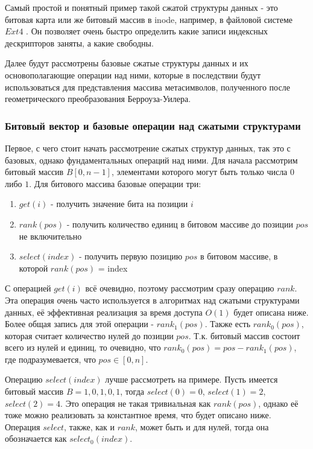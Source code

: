 \documentclass[a4paper,12pt]{article}
\begin{document}
Самый простой и понятный пример такой сжатой структуры данных - это битовая карта или же битовый массив в inode, например, в файловой системе $Ext4$ \cite{mathur2007new}. Он позволяет очень быстро определить какие записи индексных дескрипторов заняты, а какие свободны.

Далее будут рассмотрены базовые сжатые структуры данных и их основополагающие операции над ними, которые в последствии будут использоваться для представления массива метасимволов, полученного после геометрического преобразования Берроуза-Уилера.

\subsubsection{Битовый вектор и базовые операции над сжатыми структурами}
Первое, с чего стоит начать рассмотрение сжатых структур данных, так это с базовых, однако фундаментальных операций над ними. Для начала рассмотрим битовый массив $B[0, n-1]$, элементами которого могут быть только числа $0$ либо $1$. Для битового массива базовые операции три:
\begin{enumerate}
    \item $get(i)$  - получить значение бита на позиции $i$
    \item $rank(pos)$ - получить количество единиц в битовом массиве до позиции $pos$ не включительно
    \item $select(index)$ - получить первую позицию $pos$ в битовом массиве, в которой $rank(pos)$ = index
\end{enumerate}

С операцией $get(i)$ всё очевидно, поэтому рассмотрим сразу операцию $rank$. Эта операция очень часто используется в алгоритмах над сжатыми структурами данных, её эффективная реализация за время доступа $O(1)$ будет описана ниже. Более общая запись для этой операции - $rank_1(pos)$. Также есть $rank_0(pos)$, которая считает количество нулей до позиции $pos$. Т.к. битовый массив состоит всего из нулей и единиц, то очевидно, что $rank_0(pos) = pos - rank_1(pos)$, где подразумевается, что $pos \in [0, n]$.

Операцию $select(index)$  лучше рассмотреть на примере. Пусть имеется битовый массив $B={1,0,1,0,1}$, тогда $select(0) = 0$, $select(1) = 2$, $select(2) = 4$. Это операция не такая тривиальная как $rank(pos)$, однако её тоже можно реализовать за константное время, что будет описано ниже. Операция $select$, также, как и $rank$, может быть и для нулей, тогда она обозначается как $select_0(index)$.
\end{document}
